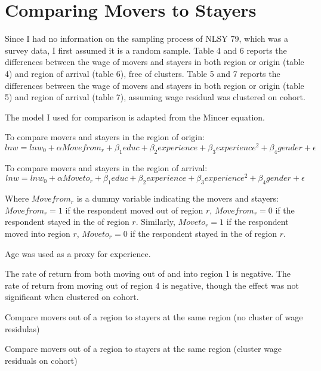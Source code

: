 \documentclass[12pt]{article}
\begin{document}
\section{Comparing Movers to Stayers} 

Since I had no information on the sampling process of NLSY 79, which was a survey data, I first assumed it is a random sample. Table  4 and 6 reports the differences between the wage of movers and stayers in both region or origin (table 4) and region of arrival (table 6), free of clusters.  Table  5 and 7 reports the differences between the wage of movers and stayers in both region or origin (table 5) and region of arrival (table 7), assuming wage residual was clustered on cohort. 

The model I used for comparison is adapted from the Mincer equation.

To compare movers and stayers in the region of origin:
\begin{equation}
lnw = lnw_0 + \alpha Move from_r  + \beta_1 educ + \beta_2 experience + \beta_3 experience^2 + \beta_4 gender+ \epsilon
\end{equation}

To compare movers and stayers in the region of arrival:
\begin{equation}
lnw = lnw_0 + \alpha Move to_r  + \beta_1 educ + \beta_2 experience + \beta_3 experience^2 + \beta_4 gender + \epsilon
\end{equation}

Where $Move from_r$ is a dummy variable indicating the movers and stayers: $Move from_r = 1$ if the respondent moved out of region $r$, $Move from_r = 0$ if the respondent stayed in the of region $r$. Similarly, $Move to_r = 1$ if the respondent moved into region $r$, $Move to_r = 0$ if the respondent stayed in the of region $r$. 

Age was used as a proxy for experience. 

The rate of return from both moving out of and into region 1 is negative. The rate of return from moving out of region 4 is negative, though the effect was not significant when clustered on cohort. 
\begin{table}[H]
\caption{Compare movers out of a region to stayers at the same region (no cluster of wage residulas)}

\end{table}

\begin{table}[H]
\caption{Compare movers out of a region to stayers at the same region (cluster wage residuals on cohort)}

\end{table}
\end{document}
